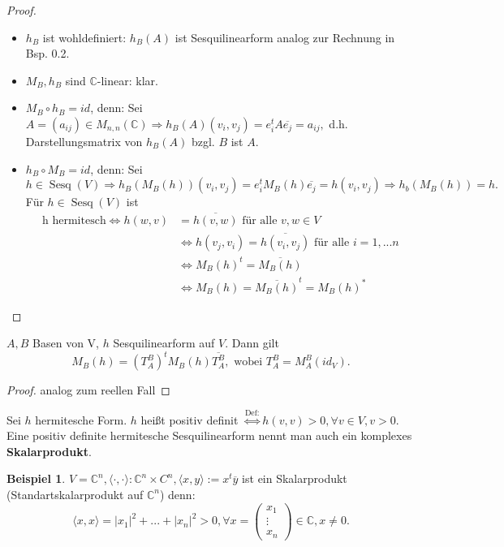 \documentclass[a4paper, titlepage]{article}
\theoremstyle{definition}
\newtheorem{bsp}[satz]{Beispiel}
\newcommand{\C}{\mathbb{C}}
\begin{document}
	 \begin{proof}\ 
	 	\begin{itemize}
	 		\item $h_B$ ist wohldefiniert: $h_B(A)$ ist Sesquilinearform analog zur Rechnung in Bsp. 0.2.
	 		\item $M_B, h_B$ sind $\C$-linear: klar.
	 		\item $M_B \circ h_B = id$, denn: Sei $A = (a_{ij}) \in M_{n,n}(\C) \Rightarrow h_B(A)(v_i,v_j) = e_i^tA\overline{e_j} = a_{ij}, $ d.h. Darstellungsmatrix von $h_B(A)$ bzgl. $B$ ist $A$.
	 		\item $h_B \circ M_B = id$, denn: Sei $h\in \operatorname{Sesq}(V) \Longrightarrow h_B(M_B(h))(v_i,v_j) = e_{i}^tM_B(h)\overline{e_j} = h(v_i, v_j) \Longrightarrow h_b(M_B(h)) = h.$
	 		Für $h\in \operatorname{Sesq}(V) $ ist 
	 		\begin{align*}
	 		\text{h hermitesch} \Leftrightarrow h(w,v) &= \overline{h(v,w)}\text{ für alle } v,w \in V\\
	 		& \Leftrightarrow h(v_j,v_i) = \overline{h(v_i,v_j)} \text{ für alle } i=1,...n \\
	 		& \Leftrightarrow M_B(h)^t = \overline{M_B(h)}\\
	 		& \Leftrightarrow M_B(h) = \overline{M_B(h)}^t = M_B(h)^{*}
	 		\end{align*}
	 	\end{itemize}
	 \end{proof}
\begin{satz}
	$A,B$ Basen von V, $h$ Sesquilinearform auf $V$. Dann gilt 
	$$M_B(h) = (T_{A}^{B})^tM_B(h)\overline{T_{A}^{B}}, \text{ wobei } T_{A}^{B} = M_{A}^{B}(id_V).$$
\end{satz}
\begin{proof}
	analog zum reellen Fall
\end{proof}
\begin{definition}
	Sei $h$ hermitesche Form. $h$ heißt positiv definit $\overset{\text{Def:}}{\Leftrightarrow} h(v,v)>0, \forall v \in V , v>0.$
	Eine positiv definite hermitesche Sesquilinearform nennt man auch ein komplexes \textbf{Skalarprodukt}.
\end{definition}
\begin{bsp}
	$V = \C^n, \langle \cdot, \cdot \rangle :\C^n \times C^n, \langle x,y \rangle := x^t\overline{y}$ ist ein Skalarprodukt (Standartskalarprodukt auf $\C^n$)
	denn: $$\langle x,x \rangle = |x_1|^2 + ... + |x_n|^2 > 0 ,\forall x = \begin{pmatrix} x_1 \\ \vdots \\ x_n \end{pmatrix} \in \C, x \neq 0.$$
\end{bsp}
\end{document}

